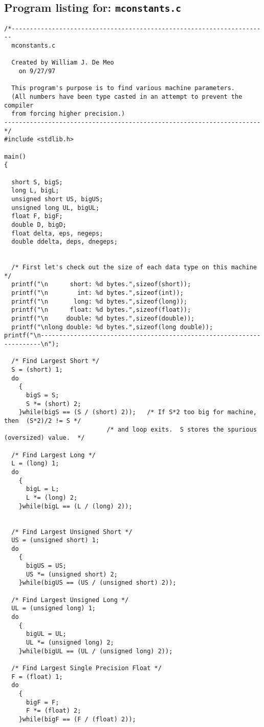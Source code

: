 \documentclass{article}
\begin{document}
\subsection{Program listing for: {\tt mconstants.c}}
\begin{verbatim}
/*----------------------------------------------------------------------
  mconstants.c

  Created by William J. De Meo
    on 9/27/97

  This program's purpose is to find various machine parameters.
  (All numbers have been type casted in an attempt to prevent the compiler 
  from forcing higher precision.)
----------------------------------------------------------------------*/
#include <stdlib.h>

main()
{

  short S, bigS;
  long L, bigL;
  unsigned short US, bigUS;
  unsigned long UL, bigUL;
  float F, bigF;
  double D, bigD;
  float delta, eps, negeps;
  double ddelta, deps, dnegeps;


  /* First let's check out the size of each data type on this machine */
  printf("\n      short: %d bytes.",sizeof(short));
  printf("\n        int: %d bytes.",sizeof(int));
  printf("\n       long: %d bytes.",sizeof(long));
  printf("\n      float: %d bytes.",sizeof(float));
  printf("\n     double: %d bytes.",sizeof(double));
  printf("\nlong double: %d bytes.",sizeof(long double));
printf("\n----------------------------------------------------------------------\n");

  /* Find Largest Short */
  S = (short) 1;
  do
    {
      bigS = S;
      S *= (short) 2;
    }while(bigS == (S / (short) 2));   /* If S*2 too big for machine, then  (S*2)/2 != S */
                            /* and loop exits.  S stores the spurious (oversized) value.  */

  /* Find Largest Long */
  L = (long) 1;
  do
    {
      bigL = L;
      L *= (long) 2;
    }while(bigL == (L / (long) 2)); 


  /* Find Largest Unsigned Short */
  US = (unsigned short) 1;
  do
    {
      bigUS = US;
      US *= (unsigned short) 2;
    }while(bigUS == (US / (unsigned short) 2)); 
                                  
  /* Find Largest Unsigned Long */
  UL = (unsigned long) 1;
  do
    {
      bigUL = UL;
      UL *= (unsigned long) 2;
    }while(bigUL == (UL / (unsigned long) 2)); 

  /* Find Largest Single Precision Float */
  F = (float) 1;
  do
    {
      bigF = F;
      F *= (float) 2;
    }while(bigF == (F / (float) 2)); 


\end{verbatim}
\end{document}
